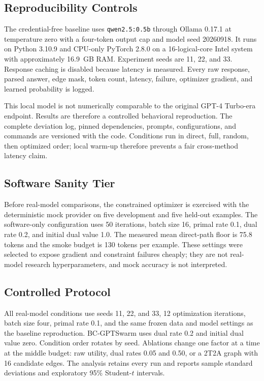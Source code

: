 \subsection{Reproducibility Controls}

The credential-free baseline uses \texttt{qwen2.5:0.5b} through Ollama 0.17.1 at temperature zero with a four-token output cap and model seed 20260918. It runs on Python 3.10.9 and CPU-only PyTorch 2.8.0 on a 16-logical-core Intel system with approximately 16.9~GB RAM. Experiment seeds are 11, 22, and 33. Response caching is disabled because latency is measured. Every raw response, parsed answer, edge mask, token count, latency, failure, optimizer gradient, and learned probability is logged.

This local model is not numerically comparable to the original GPT-4 Turbo-era endpoint. Results are therefore a controlled behavioral reproduction. The complete deviation log, pinned dependencies, prompts, configurations, and commands are versioned with the code. Conditions run in direct, full, random, then optimized order; local warm-up therefore prevents a fair cross-method latency claim.

\subsection{Software Sanity Tier}

Before real-model comparisons, the constrained optimizer is exercised with the deterministic mock provider on five development and five held-out examples. The software-only configuration uses 50 iterations, batch size 16, primal rate 0.1, dual rate 0.2, and initial dual value 1.0. The measured mean direct-path floor is 75.8 tokens and the smoke budget is 130 tokens per example. These settings were selected to expose gradient and constraint failures cheaply; they are not real-model research hyperparameters, and mock accuracy is not interpreted.

\subsection{Controlled Protocol}

All real-model conditions use seeds 11, 22, and 33, 12 optimization iterations, batch size four, primal rate 0.1, and the same frozen data and model settings as the baseline reproduction. BC-GPTSwarm uses dual rate 0.2 and initial dual value zero. Condition order rotates by seed. Ablations change one factor at a time at the middle budget: raw utility, dual rates 0.05 and 0.50, or a 2T2A graph with 16 candidate edges. The analysis retains every run and reports sample standard deviations and exploratory 95\% Student-$t$ intervals.

